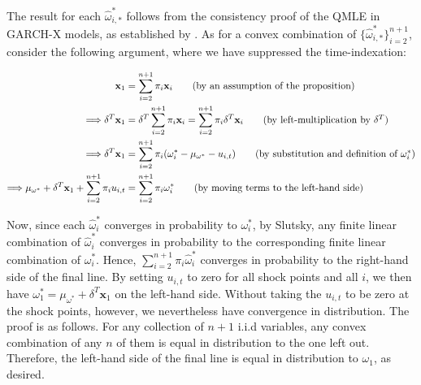 \documentclass{uiucthesis2021}
\newcommand{\weight}{\pi}
\newcommand{\x}{\textbf{x}}
\theoremstyle{definition}
\newenvironment{proof-of-proposition}[1][{}]{\noindent{\bf
    Proof of Proposition {#1}}
  \hspace*{.5em}}{\qed\bigskip\\}
\begin{document}
    \begin{proof-of-proposition}[\ref{adjustment}]
    The result for each $\hat\omega^{*}_{i,*}$ follows from the consistency proof of the QMLE in GARCH-X models, as established by \citet{han2014asymptotic}.  As for a convex combination of $\{\hat\omega^{*}_{i,*}\}_{i=2}^{n+1}$, consider the following argument, where we have suppressed the time-indexation:

    \begin{align}
    \x_{1} &= \sum^{n+1}_{i=2}\weight_{i}\x_{i} \tag{by an assumption of the proposition}\\
   \Longrightarrow \delta^{T}\x_{1} &= \delta^{T}\sum^{n+1}_{i=2}\weight_{i}\x_{i}  = \sum^{n+1}_{i=2}\weight_{i}\delta^{T}\x_{i}\tag{by left-multiplication by $\delta^{T}$}\\
    \Longrightarrow\delta^{T}\x_{1} &=\sum^{n+1}_{i=2}\pi_{i}(\omega_{i}^{*} - \mu_{\omega^{*}} - u_{i,t})\tag{by substitution and definition of $\omega^{*}_{i}$}\\
    \Longrightarrow\mu_{\omega^{*}} + \delta^{T}\x_{1} + \sum^{n+1}_{i=2}\pi_{i}u_{i,t} &= \sum^{n+1}_{i=2}\pi_{i}\omega_{i}^{*} \tag{by moving  terms to the left-hand side}
    \end{align}

Now, since each $\hat\omega^{*}_{i}$ converges in probability to $\omega^{*}_{i}$, by Slutsky, any finite linear combination of $\hat\omega^{*}_{i}$ converges in probability to the corresponding finite linear combination of $\omega^{*}_{i}$.  Hence, $\sum^{n+1}_{i=2}\pi_{i}\hat\omega_{i}^{*}$ converges in probability to the right-hand side of the final line.  By setting $u_{i,t}$ to zero for all shock points and all $i$, we then have $\omega_{1}^{*} = \mu_{\omega^{*}} + \delta^{T}\x_{1} $ on the left-hand side.  Without taking the $u_{i,t}$ to be zero at the shock points, however, we nevertheless have convergence in distribution.  The proof is as follows.  For any collection of $n+1$ i.i.d variables, any convex combination of any $n$ of them is equal in distribution to the one left out.  Therefore, the left-hand side of the final line is equal in distribution to $\omega_{1}$, as desired.
    \end{proof-of-proposition}
\end{document}
